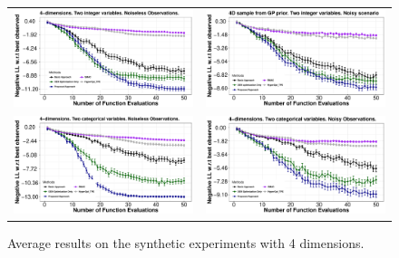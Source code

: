 \begin{figure}[htb]
\begin{tabular}{cc}
        \includegraphics[width=0.475\linewidth]{Figures/integer/synthetic/noiseless/4Dif.pdf} &
        \includegraphics[width=0.475\linewidth]{Figures/integer/synthetic/noisy/4Dinf.pdf} \\
        \includegraphics[width=0.475\linewidth]{Figures/integer/synthetic/noiseless/4Dcf.pdf} &
        \includegraphics[width=0.475\linewidth]{Figures/integer/synthetic/noisy/4Dcnf.pdf} \\
\end{tabular}
\caption{{\small Average results on the synthetic experiments with 4 dimensions.}}

\label{fig:results_synthetic_4}
\end{figure}

